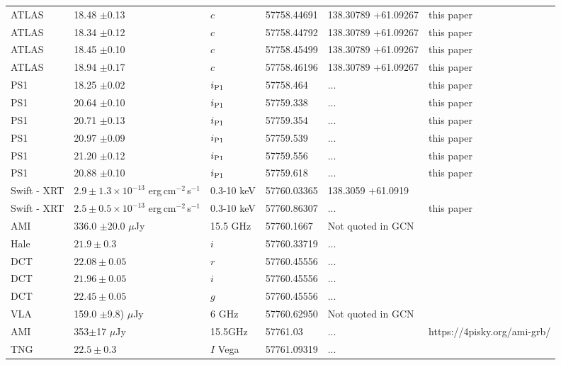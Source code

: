 \documentclass[twocolumn]{aastex61}
\newcommand{\ips}{\ensuremath{i_{\rm P1}}}
\def\ergcm2s{erg\,cm$^{-2}$\,s$^{-1}$}
\begin{document}
\begin{table*}[]
\begin{scriptsize}
\begin{tabular}{llllll}
ATLAS     & 18.48   $\pm$0.13            & $c$      & 57758.44691 & 138.30789 +61.09267 & this paper  \\
ATLAS     & 18.34   $\pm$0.12          & $c$      & 57758.44792 & 138.30789 +61.09267   & this paper \\
ATLAS     & 18.45   $\pm$0.10             & $c$      & 57758.45499  & 138.30789 +61.09267 & this paper  \\
ATLAS     & 18.94   $\pm$0.17            & $c$      & 57758.46196   & 138.30789 +61.09267 & this paper \\
PS1       & 18.25  $\pm$0.02  & \ips &    57758.464 & ...  & this paper \\
PS1       & 20.64 $\pm$0.10   & \ips &    57759.338 & ... & this paper \\
PS1       & 20.71 $\pm$0.13   & \ips &    57759.354 & ... & this paper \\
PS1       & 20.97 $\pm$0.09   & \ips &    57759.539 & ... & this paper \\
PS1       & 21.20 $\pm$0.12   & \ips &    57759.556 & ...& this paper \\
PS1       & 20.88 $\pm$0.10   & \ips &   57759.618  & ...& this paper \\
Swift - XRT &  $2.9\pm1.3\times10^{-13}$   \ergcm2s  & 0.3-10 keV &    57760.03365 & 138.3059 +61.0919 & \cite{GCN20390} \\
Swift - XRT &  $2.5\pm0.5\times10^{-13}$   \ergcm2s  & 0.3-10 keV &    57760.86307 &  ... & this paper \\
AMI & 336.0 $\pm20.0$ $\mu$Jy & 15.5 GHz & 57760.1667 & Not quoted in GCN & \cite{GCN20425}\\
Hale  & $21.9\pm0.3$  & $i$  & 57760.33719 & ... & \cite{GCN20393} \\
DCT       & $22.08 \pm0.05$        & $r$      &  57760.45556     & ... &    \cite{GCN20397} \\
DCT       & $21.96  \pm0.05$       & $i$      &  57760.45556     & ... &    \cite{GCN20397} \\
DCT       & $22.45  \pm0.05$        & $g$      & 57760.45556    & ... &    \cite{GCN20397} \\
VLA & 159.0 $\pm$9.8) $\mu$Jy & 6 GHz & 57760.62950 &  Not quoted in GCN & \cite{GCN20396} \\
AMI &	353$\pm$17 $\mu$Jy  &	15.5GHz &	57761.03    &  ... &  \scriptsize{https://4pisky.org/ami-grb/} \\
TNG       & $22.5 \pm0.3$    & $I$ Vega & 57761.09319  & ... &    \cite{GCN20416} \\

\end{tabular}
\end{scriptsize}
\end{table*}
\end{document}
